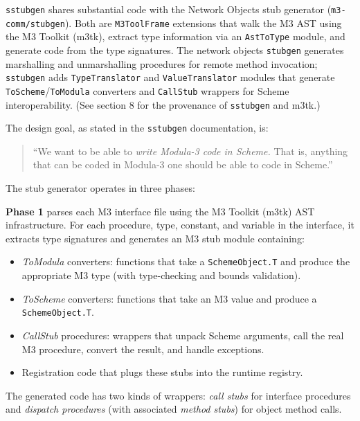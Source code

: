 \documentclass[
  12pt,
]{report}
\newcommand{\passthrough}[1]{#1}
\providecommand{\tightlist}{%
  \setlength{\itemsep}{0pt}\setlength{\parskip}{0pt}}
\begin{document}
\passthrough{\lstinline!sstubgen!} shares substantial code with the
Network Objects stub generator
(\passthrough{\lstinline!m3-comm/stubgen!}). Both are
\passthrough{\lstinline!M3ToolFrame!} extensions that walk the M3 AST
using the M3 Toolkit (m3tk), extract type information via an
\passthrough{\lstinline!AstToType!} module, and generate code from the
type signatures. The network objects \passthrough{\lstinline!stubgen!}
generates marshalling and unmarshalling procedures for remote method
invocation; \passthrough{\lstinline!sstubgen!} adds
\passthrough{\lstinline!TypeTranslator!} and
\passthrough{\lstinline!ValueTranslator!} modules that generate
\passthrough{\lstinline!ToScheme!}/\passthrough{\lstinline!ToModula!}
converters and \passthrough{\lstinline!CallStub!} wrappers for Scheme
interoperability. (See section 8 for the provenance of
\passthrough{\lstinline!sstubgen!} and m3tk.)

The design goal, as stated in the \passthrough{\lstinline!sstubgen!}
documentation, is:

\begin{quote}
``We want to be able to \emph{write Modula-3 code in Scheme.} That is,
anything that can be coded in Modula-3 one should be able to code in
Scheme.''
\end{quote}

The stub generator operates in three phases:

\textbf{Phase 1} parses each M3 interface file using the M3 Toolkit
(m3tk) AST infrastructure. For each procedure, type, constant, and
variable in the interface, it extracts type signatures and generates an
M3 stub module containing:

\begin{itemize}
\tightlist
\item
  \emph{ToModula} converters: functions that take a
  \passthrough{\lstinline!SchemeObject.T!} and produce the appropriate
  M3 type (with type-checking and bounds validation).
\item
  \emph{ToScheme} converters: functions that take an M3 value and
  produce a \passthrough{\lstinline!SchemeObject.T!}.
\item
  \emph{CallStub} procedures: wrappers that unpack Scheme arguments,
  call the real M3 procedure, convert the result, and handle exceptions.
\item
  Registration code that plugs these stubs into the runtime registry.
\end{itemize}

The generated code has two kinds of wrappers: \emph{call stubs} for
interface procedures and \emph{dispatch procedures} (with associated
\emph{method stubs}) for object method calls.
\end{document}
